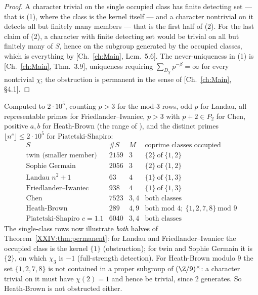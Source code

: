 \begin{proof}
A character trivial on the single occupied class has finite detecting set --- that is (1),
where the class is the kernel itself --- and a character nontrivial on it detects all but
finitely many members --- that is the first half of (2). For the last claim of (2), a
character with finite detecting set would be trivial on all but finitely many of $S$, hence
on the subgroup generated by the occupied classes, which is everything by
[Ch.~\ref{ch:Main}, Lem.~5.6]. The never-uniqueness in (1) is [Ch.~\ref{ch:Main}, Thm.~3.9], uniqueness
requiring $\sum_{D_\chi}p^{-\beta}=\infty$ for every nontrivial $\chi$; the obstruction is
permanent in the sense of [Ch.~\ref{ch:Main}, \S4.1].
\end{proof}

\begin{remark}\label{XXIV:rem:numver}
Computed to $2\cdot10^5$, counting $p>3$ for the mod-$3$ rows, odd $p$ for Landau, all
representable primes for Friedlander--Iwaniec, $p>3$ with $p+2\in P_2$ for Chen, positive
$a,b$ for Heath-Brown (the range of \cite{HB}), and the distinct primes
$\lfloor n^c\rfloor\le2\cdot10^5$ for Piatetski-Shapiro:
\[
\begin{array}{lrcl}
S & \#S & M & \text{coprime classes occupied}\\\hline
\text{twin (smaller member)} & 2159 & 3 & \{2\}\ \text{of}\ \{1,2\}\\
\text{Sophie Germain} & 2056 & 3 & \{2\}\ \text{of}\ \{1,2\}\\
\text{Landau }n^2+1 & 63 & 4 & \{1\}\ \text{of}\ \{1,3\}\\
\text{Friedlander--Iwaniec} & 938 & 4 & \{1\}\ \text{of}\ \{1,3\}\\
\text{Chen} & 7523 & 3,4 & \text{both classes}\\
\text{Heath-Brown} & 289 & 4,9 & \text{both mod }4;\ \{1,2,7,8\}\ \text{mod }9\\
\text{Piatetski-Shapiro }c=1.1 & 6040 & 3,4 & \text{both classes}
\end{array}
\]
The single-class rows now illustrate \emph{both} halves of Theorem~\ref{XXIV:thm:permanent}:
for Landau and Friedlander--Iwaniec the occupied class is the kernel $\{1\}$
(obstruction); for twin and Sophie Germain it is $\{2\}$, on which $\chi_3$ is $-1$
(full-strength detection). For Heath-Brown modulo $9$ the set $\{1,2,7,8\}$ is not
contained in a proper subgroup of
$(\Z/9)^\times$: a character trivial on it must have $\chi(2)=1$ and hence be trivial, since
$2$ generates. So Heath-Brown is not obstructed either.
\end{remark}

